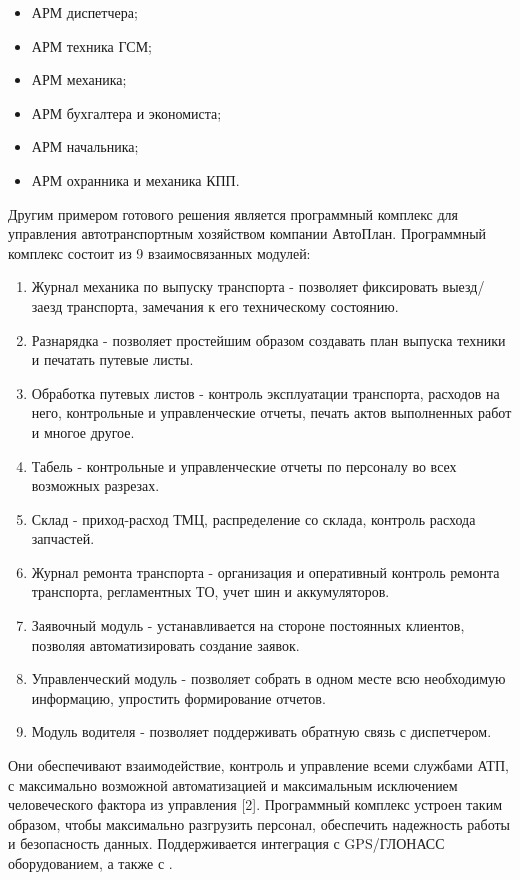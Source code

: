 \documentclass[../nirs.tex]{subfiles}
\begin{document}
\begin{itemize}
	\item АРМ диспетчера;
	\item АРМ техника ГСМ;
	\item АРМ механика;
	\item АРМ бухгалтера и экономиста;
	\item АРМ начальника;
	\item АРМ охранника и механика КПП.
\end{itemize}

Другим примером готового решения является программный комплекс для управления
автотранспортным хозяйством  компании АвтоПлан. Программный
комплекс состоит из 9 взаимосвязанных модулей:
\begin{enumerate}
	\item Журнал механика по выпуску транспорта - позволяет фиксировать
		выезд/заезд транспорта, замечания к его техническому состоянию.
	\item Разнарядка - позволяет простейшим образом создавать план выпуска
		техники и печатать путевые листы.
	\item Обработка путевых листов - контроль эксплуатации транспорта,
		расходов на него, контрольные и управленческие отчеты, печать актов
		выполненных работ и многое другое.
	\item Табель - контрольные и управленческие отчеты по персоналу во всех
		возможных разрезах.
	\item Склад - приход-расход ТМЦ, распределение со склада, контроль расхода
		запчастей.
	\item Журнал ремонта транспорта - организация и оперативный контроль
		ремонта транспорта, регламентных ТО, учет шин и аккумуляторов.
	\item Заявочный модуль - устанавливается на стороне постоянных клиентов,
		позволяя автоматизировать создание заявок.
	\item Управленческий модуль - позволяет собрать в одном месте всю
		необходимую информацию, упростить формирование отчетов.
	\item Модуль водителя - позволяет поддерживать обратную связь с
		диспетчером.
\end{enumerate}

Они обеспечивают взаимодействие, контроль и управление всеми службами АТП, с
максимально возможной автоматизацией и максимальным исключением человеческого
фактора из управления [2].
Программный комплекс устроен таким образом, чтобы максимально разгрузить
персонал, обеспечить надежность работы и безопасность данных.
Поддерживается интеграция с GPS/ГЛОНАСС оборудованием, а также с
.
\end{document}

